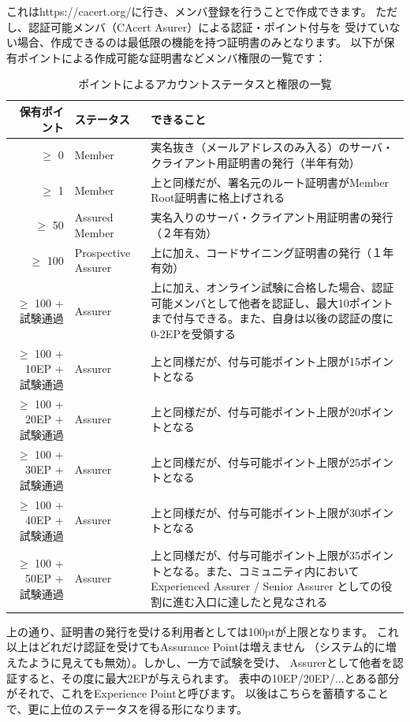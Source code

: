 \documentclass[mingoth,a4paper]{jsarticle}
\begin{document}
これはhttps://cacert.org/に行き、メンバ登録を行うことで作成できます。
ただし、認証可能メンバ（CAcert Asurer）による認証・ポイント付与を
受けていない場合、作成できるのは最低限の機能を持つ証明書のみとなります。
以下が保有ポイントによる作成可能な証明書などメンバ権限の一覧です：
\begin{table}[h]
\begin{center}
\begin{tabular}{|r|l|p{25em}|}
\hline
保有ポイント & ステータス & できること \\ \hline
$\geq$   0 & Member
      & 実名抜き（メールアドレスのみ入る）のサーバ・クライアント用証明書の発行（半年有効） \\ \hline
$\geq$   1 & Member
      & 上と同様だが、署名元のルート証明書がMember Root証明書に格上げされる \\ \hline
$\geq$  50 & Assured Member
      & 実名入りのサーバ・クライアント用証明書の発行（２年有効） \\ \hline
$\geq$ 100 & Prospective Assurer
      & 上に加え、コードサイニング証明書の発行（１年有効） \\ \hline
$\geq$ 100 + 試験通過 & Assurer
      & 上に加え、オンライン試験に合格した場合、認証可能メンバとして他者を認証し、最大10ポイントまで付与できる。また、自身は以後の認証の度に0-2EPを受領する \\ \hline
$\geq$ 100 + 10EP + 試験通過 & Assurer
      & 上と同様だが、付与可能ポイント上限が15ポイントとなる \\ \hline
$\geq$ 100 + 20EP + 試験通過 & Assurer
      & 上と同様だが、付与可能ポイント上限が20ポイントとなる \\ \hline
$\geq$ 100 + 30EP + 試験通過 & Assurer
      & 上と同様だが、付与可能ポイント上限が25ポイントとなる \\ \hline
$\geq$ 100 + 40EP + 試験通過 & Assurer
      & 上と同様だが、付与可能ポイント上限が30ポイントとなる \\ \hline
$\geq$ 100 + 50EP + 試験通過 & Assurer
      & 上と同様だが、付与可能ポイント上限が35ポイントとなる。また、コミュニティ内において Experienced Assurer / Senior Assurer としての役割に進む入口に達したと見なされる \\ \hline
\end{tabular}
\end{center}
\caption{ポイントによるアカウントステータスと権限の一覧}
\end{table}

上の通り、証明書の発行を受ける利用者としては100ptが上限となります。
これ以上はどれだけ認証を受けてもAssurance Pointは増えません
（システム的に増えたように見えても無効）。しかし、一方で試験を受け、
Assurerとして他者を認証すると、その度に最大2EPが与えられます。
表中の10EP/20EP/...とある部分がそれで、これをExperience Pointと呼びます。
以後はこちらを蓄積することで、更に上位のステータスを得る形になります。
\end{document}
